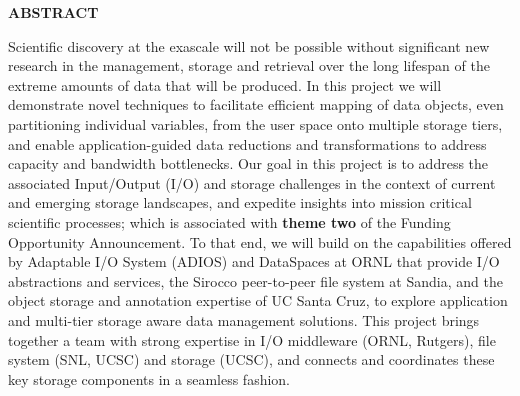 \vspace{-\belowdisplayskip}
\vspace{-\abovedisplayskip}
\medskip

\begin{center}
\textbf{ABSTRACT}
\end{center}

\vspace{-\belowdisplayskip}

\enlargethispage{2\baselineskip}
Scientific discovery at the exascale will not be possible without significant
new research in the management, storage and retrieval over the long lifespan
of the extreme amounts of data that will be produced.
In this project we will
demonstrate novel techniques to  facilitate efficient mapping of data
objects, even partitioning individual variables, from
the user space onto multiple storage tiers, and enable application-guided
data reductions and transformations to address capacity and bandwidth
bottlenecks. 
Our goal in this project is
to address the associated Input/Output (I/O) and storage challenges in the context of
current and emerging storage landscapes, and expedite insights into mission
critical scientific processes; which is associated with {\bf theme two} of the Funding Opportunity Announcement. To that end, we will build on the
capabilities offered by Adaptable I/O System (ADIOS) and DataSpaces at ORNL that provide I/O abstractions
and services, the Sirocco peer-to-peer file system at
Sandia, and the object storage and annotation expertise of UC Santa Cruz, to
explore application and multi-tier storage aware data management
solutions.    This project
brings together a  team with strong expertise in I/O middleware (ORNL, Rutgers), file system (SNL, UCSC) and storage (UCSC), and connects and
coordinates these key storage components in a seamless fashion.

